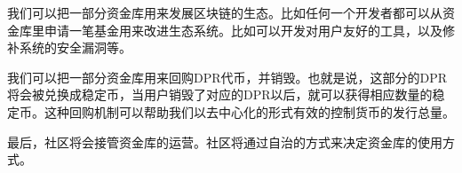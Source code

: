 \documentclass[a4paper]{article}
\begin{document}
我们可以把一部分资金库用来发展区块链的生态。比如任何一个开发者都可以从资金库里申请一笔基金用来改进生态系统。比如可以开发对用户友好的工具，以及修补系统的安全漏洞等。

我们可以把一部分资金库用来回购DPR代币，并销毁。也就是说，这部分的DPR将会被兑换成稳定币，当用户销毁了对应的DPR以后，就可以获得相应数量的稳定币。这种回购机制可以帮助我们以去中心化的形式有效的控制货币的发行总量。

最后，社区将会接管资金库的运营。社区将通过自治的方式来决定资金库的使用方式。






\end{document}
